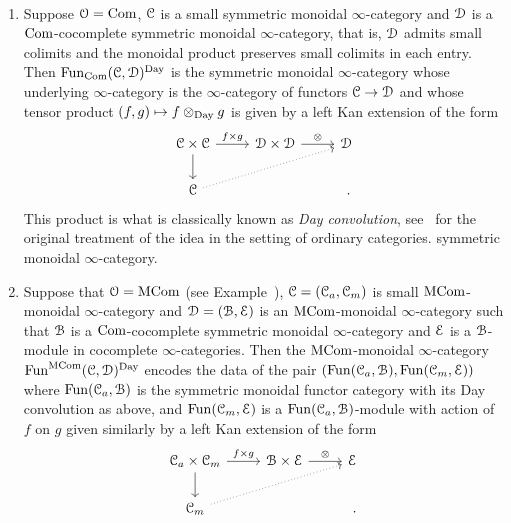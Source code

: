 \begin{examples}\
\begin{enumerate}
\item
Suppose $\mathcal{O}=\mathrm{Com}$, $\mathcal C$ is a small symmetric monoidal $\infty$-category and $\mathcal{D}$ is a $\mathrm{Com}$-cocomplete symmetric monoidal $\infty$-category, that is, $\mathcal{D}$ admits small colimits and the monoidal product preserves small colimits in each entry. 
Then $\operatorname{Fun}_{\mathrm{Com}}(\mathcal C,\mathcal{D})^{\mathrm{Day}}$ is the symmetric monoidal $\infty$-category whose underlying $\infty$-category is the $\infty$-category of functors $\mathcal C \to \mathcal{D}$ and whose tensor product $(f,g) \mapsto f \otimes_{\mathrm{Day}} g$ is given by a left Kan extension of the form 
\[
\begin{tikzcd}
\C \times \C \ar[d]\ar[r, "f \times g"] & \D \times \D \ar[r, "\otimes"] & \D \\
\C \ar[urr, dotted] && \ .
\end{tikzcd}
\]
This product is what is classically known as \emph{Day convolution}, see~\cite{day1970} for the original treatment of the idea in the setting of ordinary categories. 
symmetric monoidal $\infty$-category.
\item
Suppose that $\mathcal{O} = \mathrm{MCom}$ (see Example~), $\mathcal C = (\mathcal C_a,\mathcal C_m)$ is small $\mathrm{MCom}$-monoidal $\infty$-category and $\mathcal{D} = (\mathcal{B},\mathcal{E})$ is an $\mathrm{MCom}$-monoidal $\infty$-category %
such that $\mathcal{B}$ is a $\mathrm{Com}$-cocomplete
symmetric monoidal $\infty$-category and $\mathcal{E}$ is a $\mathcal{B}$-module in cocomplete $\infty$-categories.
Then the $\mathrm{MCom}$-monoidal $\infty$-category $\operatorname{Fun}^{\mathrm{MCom}}(\mathcal C,\mathcal{D})^{\mathrm{Day}}$ encodes the data of the pair $(\operatorname{Fun}(\mathcal C_a,\mathcal{B}),\operatorname{Fun}(\mathcal C_m,\mathcal{E}))$ where $\operatorname{Fun}(\mathcal C_a,\mathcal{B})$ is the %
symmetric monoidal functor category with its Day convolution as above, and $\operatorname{Fun}(\mathcal C_m,\mathcal{E})$ is a $\operatorname{Fun}(\mathcal C_a,\mathcal{B})$-module %
with action of $f$ on $g$ given similarly by a left Kan extension of the form 
\[
\begin{tikzcd}
\C_a \times \C_m \ar[d]\ar[r, "f \times g"] & \cB \times \E \ar[r, "\otimes"] & \E \\
\C_m \ar[urr, dotted] && \ .
\end{tikzcd}
\]
\end{enumerate}
\end{examples}



